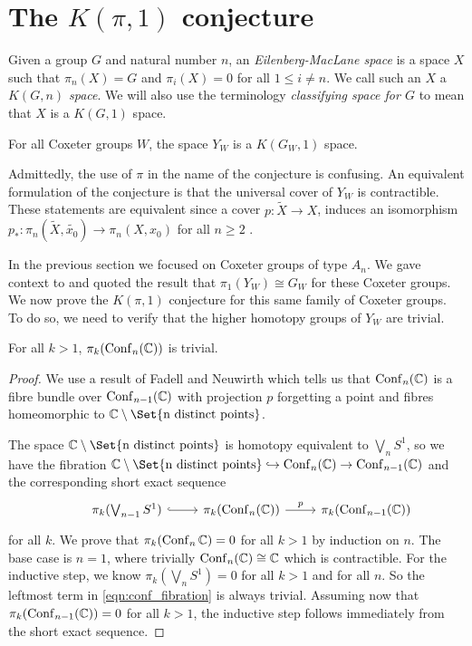 \documentclass[class=article, crop=false]{standalone}
\begin{document}
	
\section{The \texorpdfstring{$K(\pi,1)$}{K pi 1} conjecture}
Given a group $G$ and natural number $n$, an \emph{Eilenberg-MacLane space} \cite{eilenberg_maclane_relations_1945} is a space $X$ such that $\pi_n(X)=G$ and $\pi_i(X) = 0$ for all $1\leq i \neq n$. We call such an $X$ a \emph{$K(G,n)$ space}. We will also use the terminology \emph{classifying space for $G$} to mean that $X$ is a $K(G,1)$ space.
\begin{conjecture}[$K(\pi,1)$ Conjecture]
	For all Coxeter groups $W$, the space $Y_W$ is a $K(G_W,1)$ space.
\end{conjecture}

Admittedly, the use of $\pi$ in the name of the conjecture is confusing. An equivalent formulation of the conjecture is that the universal cover of $Y_W$ is contractible. These statements are equivalent since a cover $p \colon \widetilde{X} \to X$, induces an isomorphism  $p_* \colon \pi_n(\widetilde{X},\widetilde{x_0}) \to \pi_n(X,x_0)$ for all $n\geq 2$ \cite[Proposition 4.1]{hatcher_algebraic_2001}.

In the previous section we focused on Coxeter groups of type $A_n$. We gave context to and quoted the result that $\pi_1(Y_W) \cong G_W$ for these Coxeter groups. We now prove the $K(\pi,1)$ conjecture for this same family of Coxeter groups. To do so, we need to verify that the higher homotopy groups of $Y_W$ are trivial.

\begin{lemma}
	For all $k>1$, $\pi_k(\operatorname{Conf}_n(\mathbb{C}))$ is trivial.
	\label{lem:labelled_conf_classiftying_space}
\end{lemma}
\begin{proof}
	We use a result of Fadell and Neuwirth \cite[Theorem 3]{fadell_neuwirth_configuration_1962} which tells us that $\operatorname{Conf}_n(\mathbb{C})$ is a fibre bundle over $\operatorname{Conf}_{n-1}(\mathbb{C})$ with projection $p$ forgetting a point and fibres homeomorphic to $\C \setminus \Set{\text{n distinct points}}$.

The space $\C \setminus \Set{\text{n distinct points}}$ is homotopy equivalent to $\bigvee_n S^1$, so we have the fibration $\C \setminus \Set{\text{n distinct points}} \hookrightarrow \conf_n(\C) \to \conf_{n-1}(\C)$ and the corresponding short exact sequence
\begin{equation}
	\begin{tikzcd}
		&\pi_k(\bigvee_{n-1} S^1) \arrow[hook]{r} &\pi_k(\conf_n(\C)) \arrow{r}{p} &\pi_k(\conf_{n-1}(\C))
	\end{tikzcd}
	\label{eqn:conf_fibration}
\end{equation}
for all $k$.
We prove that $\pi_k(\operatorname{Conf}_n{\mathbb{C}})=0$ for all $k>1$ by induction on $n$. The base case is $n=1$, where trivially $\operatorname{Conf}_n(\mathbb{C}) \cong \mathbb{C}$ which is contractible. For the inductive step, we know $\pi_k(\bigvee_nS^1)=0$ for all $k>1$ and for all $n$. So the leftmost term in \eqref{eqn:conf_fibration} is always trivial. Assuming now that $\pi_k(\operatorname{Conf}_{n-1}(\mathbb{C})) = 0$ for all $k>1$, the inductive step follows immediately from the short exact sequence.
\end{proof}
\end{document}
